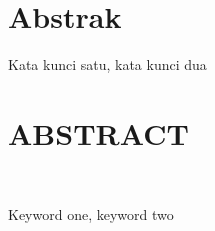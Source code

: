%
%
%

\chapter*{Abstrak}

\vspace*{0.2cm}


\noindent {}

\lipsum[10-12]

\vspace*{0.2cm}

\noindent {} Kata kunci satu, kata kunci dua \\

\newpage

\chapter*{ABSTRACT}

\vspace*{0.2cm}



\noindent {}

\lipsum[67-69] \\

\vspace*{0.2cm}

\noindent {} Keyword one, keyword two \\

\newpage
